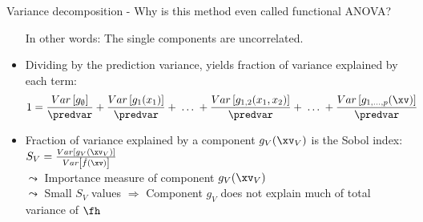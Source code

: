 \documentclass[11pt,compress,t,notes=noshow, aspectratio=169, xcolor=table]{beamer}
\newcommand{\open}{}
\newcommand{\close}{}
\begin{document}
\begin{frame}{Variance decomposition - Why is this method even called functional ANOVA?}
\begin{itemize}[<+->]
In other words: The single components are uncorrelated.


\item Dividing by the prediction variance, yields fraction of variance explained by each term:
\begin{align*}
1 &= \frac{Var\left[g_{\open \emptyset \close}\right]}{\predvar} + \frac{Var\left[g_{\open 1 \close}(x_1)\right]}{\predvar} + %
\;\dots\;
+ \frac{Var\left[g_{\open 1, 2 \close}(x_1, x_2)\right]}{\predvar} + \;\dots\; + \frac{Var\left[g_{\open 1,\ldots,p \close}(\xv)\right]}{\predvar}
\end{align*}

\item Fraction of variance explained by a component $g_{\open V \close}(\xv_V)$ is the Sobol index:
$
S_V = \frac{Var\left[g_{\open V \close}(\xv_V)\right]}{Var\left[\hat{f}(\xv)\right]}
$\\
$\leadsto$ Importance measure of component $g_{\open V \close}(\xv_V)$\\
$\leadsto$ Small $S_V$ values $\Rightarrow$ Component $g_{\open V \close}$ does not explain much of total variance of $\fh$
\end{itemize}

\end{frame}











\endlecture
\end{document}
